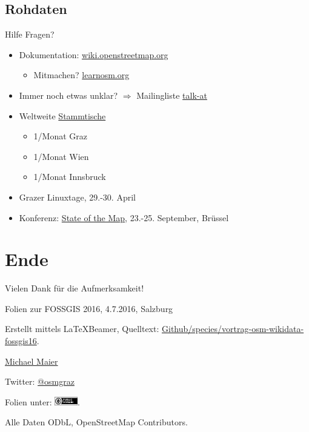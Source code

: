 \documentclass{beamer}
\begin{document}
\subsection{Rohdaten}

\begin{frame}{Hilfe}
Fragen? 
\begin{itemize}
  \item Dokumentation: \href{http://wiki.openstreetmap.org}{wiki.openstreetmap.org}
  \begin{itemize} 
    \item Mitmachen? \href{http://learnosm.org/}{learnosm.org}
  \end{itemize}
  \item Immer noch etwas unklar? $\Rightarrow$ Mailingliste \href{http://lists.openstreetmap.org/listinfo/talk-at}{talk-at}
 \vspace*{0.4cm}
  \item Weltweite \href{http://usergroups.openstreetmap.de/}{Stammtische}
  \begin{itemize}
    \item 1/Monat Graz
    \item 1/Monat Wien
    \item 1/Monat Innsbruck
  \end{itemize}
 \vspace*{0.4cm}
  \item Grazer Linuxtage, 29.-30. April

\end{itemize}

 \vspace*{-2.8cm}

\begin{itemize}
  \item Konferenz: \href{http://stateofthemap.org/}{State of the Map}, 23.-25. September, Brüssel
\end{itemize}
\end{frame}

\section{Ende}

\begin{frame}{Vielen Dank für die Aufmerksamkeit!}

  Folien zur FOSSGIS 2016, 4.7.2016, Salzburg
\vspace{1cm}

Erstellt mittels \LaTeX Beamer, Quelltext: \href{https://github.com/species/vortrag-osm-wikidata-fossgis16}{Github/species/vortrag-osm-wikidata-fossgis16}.
\vspace{1cm}

\href{mailto:michael.maier@mailbox.org}{Michael Maier}

Twitter: \href{https://twitter.com/osmgraz}{@osmgraz}
\vspace{1cm}

Folien unter: \includegraphics[width=1cm]{cc-zero.pdf}. 

Alle Daten ODbL, OpenStreetMap Contributors.

\end{frame}
\end{document}
